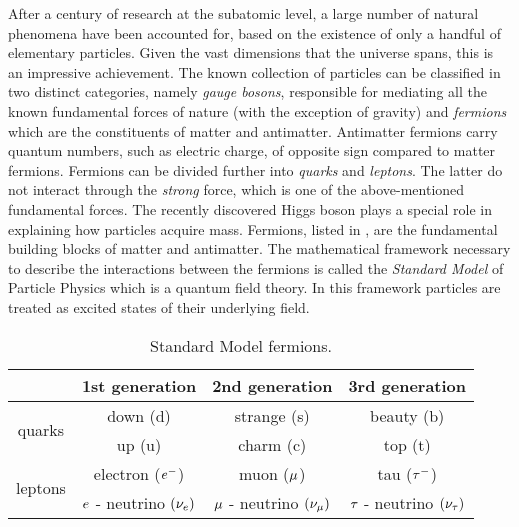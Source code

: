 After a century of research at the subatomic level, a large number of natural phenomena have been accounted
for, based on the existence of only a handful of elementary particles. Given the vast dimensions that the
universe spans, this is an impressive achievement. The known collection of particles can be classified
in two distinct categories, namely {\it gauge bosons}, responsible for mediating all the known fundamental
forces of nature (with the exception of gravity) and {\it fermions} which are the constituents
of matter and antimatter. Antimatter fermions carry quantum numbers, such as electric charge, of opposite
sign compared to matter fermions. Fermions can be divided further into {\it quarks}
and {\it leptons}. The latter do not interact through the {\it strong} force, which is
one of the above-mentioned fundamental forces. The recently discovered Higgs
boson \cite{higgs-cms,higgs-atlas} plays a special role in explaining how particles acquire mass.
Fermions, listed in , are the fundamental building blocks of matter and antimatter.
The mathematical framework necessary to describe the interactions between the fermions is called the
\textit{Standard Model} of Particle Physics \cite{sm-glashow,sm-weinberg,sm-salam} which is a quantum
field theory. In this framework particles are treated as excited states of their underlying field.


\begin{table}[h!]
  \centering
 \begin{tabular}{cccc}
   \hline
                            &  1st generation                     &   2nd generation              &  3rd generation    \\
   \hline
   \multirow{2}{*}{quarks}  &  down (d)                           &   strange (s)                 &  beauty (b)        \\
                            &  up (u)                             &   charm (c)                   &  top (t)           \\
   \hline
   \multirow{2}{*}{leptons} &   electron ($e^-$)                  &   muon ($\mu$)               &  tau ($\tau^-$)     \\
                            &   $e$ - neutrino $(\nu_e)$  &  $\mu$ - neutrino $(\nu_\mu)$  &  $\tau$ - neutrino $(\nu_\tau)$  \\
   \hline
 \end{tabular}
 \caption{Standard Model fermions.}
 \label{quarksLeptons}
\end{table}

